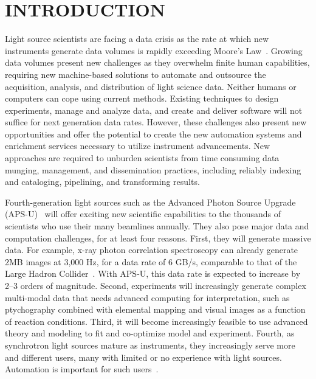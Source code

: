 \documentclass{aip-cp}
\newcommand\ryan[1]{}
\newcommand\ryan[1]{{\color{green}[Ryan: #1]}}
\begin{document}
\section{INTRODUCTION}


Light source scientists are facing a data crisis as the rate at which new instruments generate data 
volumes is rapidly exceeding Moore's Law~\cite{toby2015practices}. Growing data 
volumes present new challenges as they overwhelm finite human capabilities, requiring new 
machine-based solutions to automate and outsource the acquisition, analysis, and 
distribution of 
light science data. Neither humans or computers can cope using current methods. Existing 
techniques to design experiments, manage and analyze data, and create and 
deliver software will not suffice for next generation data rates. However, these 
challenges also present new opportunities and offer the potential to create the new automation 
systems and enrichment services necessary to utilize instrument advancements. New 
approaches are required to unburden scientists from time consuming data munging, management, 
and dissemination practices, including reliably indexing and cataloging, pipelining, and 
transforming results.

Fourth-generation light sources such as the Advanced Photon Source Upgrade (APS-U)~\cite{APSU} will offer exciting new
scientific capabilities to the thousands of scientists who use their many beamlines annually.
They also pose major data and computation challenges, for at least four reasons.
First, they will generate massive data. 
For example, x-ray photon correlation spectroscopy can already generate 2MB images at 3,000 Hz,
for a data rate of 6 GB/s, comparable to that of the Large Hadron Collider~\cite{lhcrate}.
With APS-U, this data rate is expected to increase by 2--3 orders of magnitude.
Second, experiments will increasingly generate complex multi-modal data that needs advanced computing
for interpretation, such as ptychography combined with 
elemental mapping and visual images as a function of reaction conditions.
Third, it will become increasingly feasible to use advanced theory and modeling to fit and co-optimize 
model and experiment. 
Fourth, as synchrotron light sources mature as instruments, they increasingly serve more and 
different users,
many with limited or no experience with light sources. 
Automation is important for such users~\cite{hiraki2008high,toby2009management}.
\end{document}
